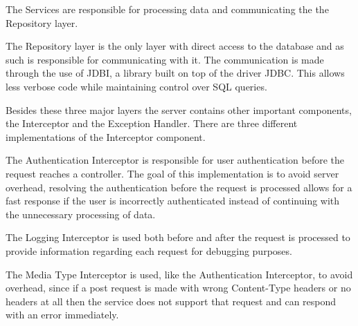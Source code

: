 The Services are responsible for processing data and communicating the the Repository layer.

The Repository layer is the only layer with direct access to the database and as such is responsible for communicating
with it. The communication is made through the use of JDBI\cite{jdbidocs}, a library built on top of the driver JDBC\cite{jdbcdocs}. This allows
less verbose code while maintaining control over SQL queries. 

Besides these three major layers the server contains other important components, the Interceptor\cite{springinterceptor} and the Exception Handler\cite{springexception}.
There are three different implementations of the Interceptor component.

The Authentication Interceptor is responsible for user authentication before the request reaches a controller. The goal of this
implementation is to avoid server overhead, resolving the authentication before the request is processed allows for a fast response
if the user is incorrectly authenticated instead of continuing with the unnecessary processing of data.

The Logging Interceptor is used both before and after the request is processed to provide information 
regarding each request for debugging purposes.

The Media Type Interceptor is used, like the Authentication Interceptor, to avoid overhead, since if a post request is made
with wrong Content-Type headers or no headers at all then the service does not support that request and can respond with an 
error immediately.

